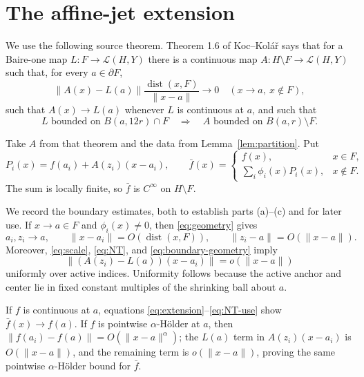 \documentclass[11pt]{article}
\newcommand{\cL}{\mathcal L}
\newcommand{\dist}{\operatorname{dist}}
\begin{document}
\section{The affine-jet extension}

We use the following source theorem.  Theorem 1.6 of Koc--Kol\'a\v r
\cite{KK} says that for a Baire-one map
$L:F\to\cL(H,Y)$ there is a continuous map
$A:H\setminus F\to\cL(H,Y)$ such that, for every $a\in\partial F$,
\begin{equation}
 \|A(x)-L(a)\|\frac{\dist(x,F)}{\|x-a\|}\longrightarrow0
 \quad(x\to a,\ x\notin F),
 \label{eq:NT}
\end{equation}
such that $A(x)\to L(a)$ whenever $L$ is continuous at $a$, and such that
\begin{equation}
 L\text{ bounded on }B(a,12r)\cap F
 \quad\Longrightarrow\quad
 A\text{ bounded on }B(a,r)\setminus F.
 \label{eq:B}
\end{equation}

Take $A$ from that theorem and the data from Lemma~\ref{lem:partition}.  Put
\begin{equation}
 P_i(x)=f(a_i)+A(z_i)(x-a_i),
 \qquad
 \bar f(x)=
 \begin{cases}
 f(x),&x\in F,\\[2mm]
 \displaystyle\sum_i\phi_i(x)P_i(x),&x\notin F.
 \end{cases}
 \label{eq:extension}
\end{equation}
The sum is locally finite, so $\bar f$ is $C^\infty$ on $H\setminus F$.

We record the boundary estimates, both to establish parts (a)--(c) and for
later use.  If $x\to a\in F$ and $\phi_i(x)\ne0$, then
\eqref{eq:geometry} gives
\begin{equation}
 a_i,z_i\to a,
 \qquad
 \|x-a_i\|=O(\dist(x,F)),
 \qquad
 \|z_i-a\|=O(\|x-a\|).
 \label{eq:boundary-geometry}
\end{equation}
Moreover, \eqref{eq:scale}, \eqref{eq:NT}, and
\eqref{eq:boundary-geometry} imply
\begin{equation}
 \|(A(z_i)-L(a))(x-a_i)\|=o(\|x-a\|)
 \label{eq:NT-use}
\end{equation}
uniformly over active indices.  Uniformity follows because the active anchor
and center lie in fixed constant multiples of the shrinking ball about $a$.

If $f$ is continuous at $a$, equations \eqref{eq:extension}--\eqref{eq:NT-use}
show $\bar f(x)\to f(a)$.  If $f$ is pointwise $\alpha$-H\"older at $a$,
then
$\|f(a_i)-f(a)\|=O(\|x-a\|^\alpha)$; the $L(a)$ term in
$A(z_i)(x-a_i)$ is $O(\|x-a\|)$, and the remaining term is
$o(\|x-a\|)$, proving the same pointwise $\alpha$-H\"older bound for
$\bar f$.
\end{document}
